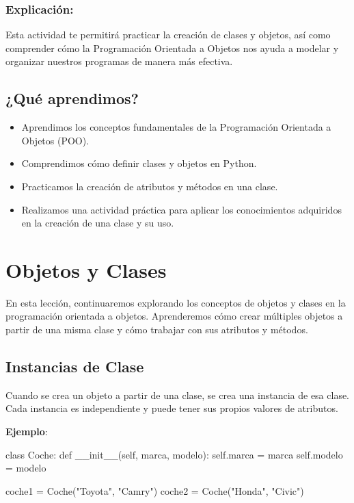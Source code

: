 \documentclass[
  a4paper,
  DIV=11,
  numbers=noendperiod,
  onepage,
  openany]{scrreprt}
\newenvironment{Shaded}{\begin{snugshade}}{\end{snugshade}}
\newcommand{\FunctionTok}[1]{\textcolor[rgb]{0.28,0.35,0.67}{#1}}
\newcommand{\KeywordTok}[1]{\textcolor[rgb]{0.00,0.23,0.31}{#1}}
\newcommand{\NormalTok}[1]{\textcolor[rgb]{0.00,0.23,0.31}{#1}}
\newcommand{\OperatorTok}[1]{\textcolor[rgb]{0.37,0.37,0.37}{#1}}
\newcommand{\StringTok}[1]{\textcolor[rgb]{0.13,0.47,0.30}{#1}}
\newcommand{\VariableTok}[1]{\textcolor[rgb]{0.07,0.07,0.07}{#1}}
\providecommand{\tightlist}{%
  \setlength{\itemsep}{0pt}\setlength{\parskip}{0pt}}\usepackage{longtable,booktabs,array}
\begin{document}
\subsection{Explicación:}\label{explicaciuxf3n-36}

Esta actividad te permitirá practicar la creación de clases y objetos,
así como comprender cómo la Programación Orientada a Objetos nos ayuda a
modelar y organizar nuestros programas de manera más efectiva.

\section{¿Qué aprendimos?}\label{quuxe9-aprendimos-13}

\begin{itemize}
\tightlist
\item
  Aprendimos los conceptos fundamentales de la Programación Orientada a
  Objetos (POO).
\item
  Comprendimos cómo definir clases y objetos en Python.
\item
  Practicamos la creación de atributos y métodos en una clase.
\item
  Realizamos una actividad práctica para aplicar los conocimientos
  adquiridos en la creación de una clase y su uso.
\end{itemize}

\chapter{Objetos y Clases}\label{objetos-y-clases}

En esta lección, continuaremos explorando los conceptos de objetos y
clases en la programación orientada a objetos. Aprenderemos cómo crear
múltiples objetos a partir de una misma clase y cómo trabajar con sus
atributos y métodos.

\section{Instancias de Clase}\label{instancias-de-clase}

Cuando se crea un objeto a partir de una clase, se crea una instancia de
esa clase. Cada instancia es independiente y puede tener sus propios
valores de atributos.

\textbf{Ejemplo}:

\begin{Shaded}
\begin{Highlighting}[]
\KeywordTok{class}\NormalTok{ Coche:}
    \KeywordTok{def} \FunctionTok{\_\_init\_\_}\NormalTok{(}\VariableTok{self}\NormalTok{, marca, modelo):}
        \VariableTok{self}\NormalTok{.marca }\OperatorTok{=}\NormalTok{ marca}
        \VariableTok{self}\NormalTok{.modelo }\OperatorTok{=}\NormalTok{ modelo}

\NormalTok{coche1 }\OperatorTok{=}\NormalTok{ Coche(}\StringTok{"Toyota"}\NormalTok{, }\StringTok{"Camry"}\NormalTok{)}
\NormalTok{coche2 }\OperatorTok{=}\NormalTok{ Coche(}\StringTok{"Honda"}\NormalTok{, }\StringTok{"Civic"}\NormalTok{)}
\end{Highlighting}
\end{Shaded}
\end{document}
